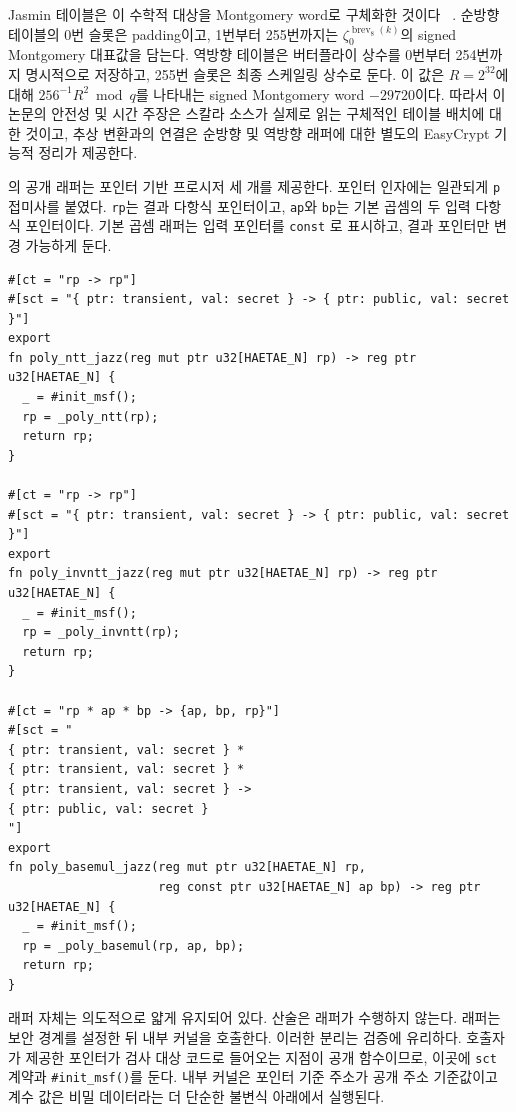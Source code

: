 \documentclass[10pt,twocolumn]{article}
\newcommand{\jasmin}{Jasmin}
\begin{document}
\jasmin{} 테이블은 이 수학적 대상을 Montgomery word로 구체화한 것이다
~\cite{Montgomery1985}. 순방향 테이블의 0번 슬롯은 padding이고, 1번부터
255번까지는 \(\zeta_0^{\operatorname{brev}_8(k)}\)의 signed Montgomery
대표값을 담는다. 역방향 테이블은 버터플라이 상수를 0번부터 254번까지
명시적으로 저장하고, 255번 슬롯은 최종 스케일링 상수로 둔다. 이 값은
\(R=2^{32}\)에 대해 \(256^{-1}R^2\bmod q\)를 나타내는 signed
Montgomery word \(-29720\)이다. 따라서 이 논문의 안전성 및 시간 주장은
스칼라 소스가 실제로 읽는 구체적인 테이블 배치에 대한 것이고,
추상 변환과의 연결은 순방향 및 역방향 래퍼에 대한 별도의 EasyCrypt
기능적 정리가 제공한다.

의 공개 래퍼는 포인터 기반 프로시저 세 개를 제공한다.
포인터 인자에는 일관되게 \texttt{p} 접미사를 붙였다. \texttt{rp}는
결과 다항식 포인터이고, \texttt{ap}와 \texttt{bp}는 기본 곱셈의 두
입력 다항식 포인터이다. 기본 곱셈 래퍼는 입력 포인터를 \texttt{const}
로 표시하고, 결과 포인터만 변경 가능하게 둔다.

\begin{lstlisting}[caption={\texttt{hpoly.jazz}의 공개 래퍼 형태.},label={lst:wrappers}]
#[ct = "rp -> rp"]
#[sct = "{ ptr: transient, val: secret } -> { ptr: public, val: secret }"]
export
fn poly_ntt_jazz(reg mut ptr u32[HAETAE_N] rp) -> reg ptr u32[HAETAE_N] {
  _ = #init_msf();
  rp = _poly_ntt(rp);
  return rp;
}

#[ct = "rp -> rp"]
#[sct = "{ ptr: transient, val: secret } -> { ptr: public, val: secret }"]
export
fn poly_invntt_jazz(reg mut ptr u32[HAETAE_N] rp) -> reg ptr u32[HAETAE_N] {
  _ = #init_msf();
  rp = _poly_invntt(rp);
  return rp;
}

#[ct = "rp * ap * bp -> {ap, bp, rp}"]
#[sct = "
{ ptr: transient, val: secret } *
{ ptr: transient, val: secret } *
{ ptr: transient, val: secret } ->
{ ptr: public, val: secret }
"]
export
fn poly_basemul_jazz(reg mut ptr u32[HAETAE_N] rp,
                     reg const ptr u32[HAETAE_N] ap bp) -> reg ptr u32[HAETAE_N] {
  _ = #init_msf();
  rp = _poly_basemul(rp, ap, bp);
  return rp;
}
\end{lstlisting}

래퍼 자체는 의도적으로 얇게 유지되어 있다. 산술은 래퍼가 수행하지
않는다. 래퍼는 보안 경계를 설정한 뒤 내부 커널을 호출한다. 이러한
분리는 검증에 유리하다. 호출자가 제공한 포인터가 검사 대상 코드로
들어오는 지점이 공개 함수이므로, 이곳에 \texttt{sct} 계약과
\texttt{\#init\_msf()}를 둔다. 내부 커널은 포인터 기준 주소가 공개
주소 기준값이고 계수 값은 비밀 데이터라는 더 단순한 불변식 아래에서
실행된다.
\end{document}
